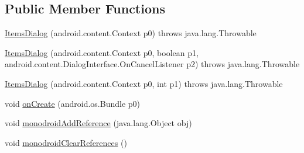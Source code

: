 \subsection*{Public Member Functions}
\begin{DoxyCompactItemize}
\item 
\hyperlink{classfieldservice_1_1android_1_1dialogs_1_1_items_dialog_ad1e8f18066db5c642db2fefe16845908}{Items\+Dialog} (android.\+content.\+Context p0)  throws java.\+lang.\+Throwable 	
\item 
\hyperlink{classfieldservice_1_1android_1_1dialogs_1_1_items_dialog_afb207509af6e923850cc6b89d6178d12}{Items\+Dialog} (android.\+content.\+Context p0, boolean p1, android.\+content.\+Dialog\+Interface.\+On\+Cancel\+Listener p2)  throws java.\+lang.\+Throwable 	
\item 
\hyperlink{classfieldservice_1_1android_1_1dialogs_1_1_items_dialog_a61e6ce388d6ad602f74b45c7c952e912}{Items\+Dialog} (android.\+content.\+Context p0, int p1)  throws java.\+lang.\+Throwable 	
\item 
void \hyperlink{classfieldservice_1_1android_1_1dialogs_1_1_items_dialog_ac80c3cbdfb64997aa90ad79e1db7ba6b}{on\+Create} (android.\+os.\+Bundle p0)
\item 
void \hyperlink{classfieldservice_1_1android_1_1dialogs_1_1_items_dialog_a9e79759c0e727aa35915171339390130}{monodroid\+Add\+Reference} (java.\+lang.\+Object obj)
\item 
void \hyperlink{classfieldservice_1_1android_1_1dialogs_1_1_items_dialog_a4f6e3878cb2adaac9527ab237deb8eae}{monodroid\+Clear\+References} ()
\end{DoxyCompactItemize}


